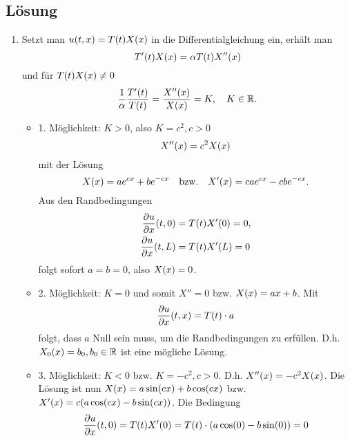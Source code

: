 \documentclass{exercise}
\begin{document}
    \subsection*{Lösung}
    \begin{enumerate}
        \item Setzt man \(u\parentheses*{t, x} = T\parentheses*{t}X\parentheses*{x}\) in die Differentialgleichung ein, erhält man
        \[
            T'\parentheses*{t}X\parentheses*{x} = \alpha T\parentheses*{t}X''\parentheses*{x}
        \]
        und für \(T\parentheses*{t}X\parentheses*{x} \ne 0\)
        \[
            \frac{1}{\alpha}\frac{T'\parentheses*{t}}{T\parentheses*{t}} = \frac{X''\parentheses*{x}}{X\parentheses*{x}} = K, \quad K \in \R.
        \]
        \begin{itemize}
            \item 1. Möglichkeit: \(K > 0\), also \(K = c^2, c > 0\)
            \[
                X''\parentheses*{x} = c^2 X\parentheses*{x}
            \]
            mit der Lösung
            \[
                X\parentheses*{x} = ae^{cx} + be^{-cx} \quad \text{bzw.} \quad X'\parentheses*{x} = cae^{cx} - cbe^{-cx}.
            \]
            Aus den Randbedingungen
            \begin{align*}
                \frac{\partial u}{\partial x}\parentheses*{t, 0} &= T\parentheses*{t}X'\parentheses*{0} = 0,\\
                \frac{\partial u}{\partial x}\parentheses*{t, L} &= T\parentheses*{t}X'\parentheses*{L} = 0
            \end{align*}
            folgt sofort \(a = b = 0\), also \(X\parentheses*{x} = 0\).
            \item 2. Möglichkeit: \(K = 0\) und somit \(X'' = 0\) bzw. \(X\parentheses*{x} = ax + b\).
            Mit
            \[
                \frac{\partial u}{\partial x}\parentheses*{t, x} = T\parentheses*{t} \cdot a
            \]
            folgt, dass \(a\) Null sein muss, um die Randbedingungen zu erfüllen.
            D.h. \(X_0\parentheses*{x} = b_0, b_0 \in \R\) ist eine mögliche Lösung.
            \item 3. Möglichkeit: \(K < 0\) bzw. \(K = -c^2, c > 0\).
            D.h. \(X''\parentheses*{x} = -c^2 X\parentheses*{x}\).
            Die Lösung ist nun \(X\parentheses*{x} = a\sin\parentheses*{cx} + b\cos\parentheses*{cx}\) bzw. \(X'\parentheses*{x} = c\parentheses*{a\cos\parentheses*{cx} - b\sin\parentheses*{cx}}\).
            Die Bedingung
            \[
                \frac{\partial u}{\partial x}\parentheses*{t, 0} = T\parentheses*{t}X'\parentheses*{0} = T\parentheses*{t} \cdot \parentheses*{a\cos\parentheses*{0} - b\sin\parentheses*{0}} = 0
\]
\end{itemize}
\end{enumerate}
\end{document}
